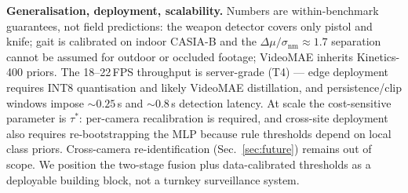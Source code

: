 \documentclass[runningheads]{llncs}
\begin{document}
\textbf{Generalisation, deployment, scalability.} Numbers are within-benchmark guarantees, not field predictions: the weapon detector covers only pistol and knife; gait is calibrated on indoor CASIA-B and the $\Delta\mu/\sigma_\text{nm}\!\approx\!1.7$ separation cannot be assumed for outdoor or occluded footage; VideoMAE inherits Kinetics-400 priors. The 18--22\,FPS throughput is server-grade (T4) --- edge deployment requires INT8 quantisation and likely VideoMAE distillation, and persistence/clip windows impose $\sim 0.25$\,s and $\sim 0.8$\,s detection latency. At scale the cost-sensitive parameter is $\tau^*$: per-camera recalibration is required, and cross-site deployment also requires re-bootstrapping the MLP because rule thresholds depend on local class priors. Cross-camera re-identification (Sec.~\ref{sec:future}) remains out of scope. We position the two-stage fusion plus data-calibrated thresholds as a deployable building block, not a turnkey surveillance system.
\end{document}

